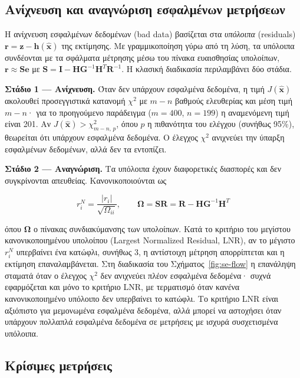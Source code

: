 \subsection{Ανίχνευση και αναγνώριση εσφαλμένων μετρήσεων}
\label{sec:baddata}

Η ανίχνευση εσφαλμένων δεδομένων (bad data) βασίζεται στα \emph{υπόλοιπα} (residuals)
$\mathbf{r} = \mathbf{z}-\mathbf{h}(\hat{\mathbf{x}})$ της εκτίμησης. Με γραμμικοποίηση γύρω από
τη λύση, τα υπόλοιπα συνδέονται με τα σφάλματα μέτρησης μέσω του πίνακα ευαισθησίας
υπολοίπων, $\mathbf{r} \approx \mathbf{S}\mathbf{e}$ με
$\mathbf{S} = \mathbf{I} - \mathbf{H}\mathbf{G}^{-1}\mathbf{H}^{T}\mathbf{R}^{-1}$. Η κλασική
διαδικασία περιλαμβάνει δύο στάδια.

\textbf{Στάδιο 1 --- Ανίχνευση.} Όταν δεν υπάρχουν εσφαλμένα δεδομένα, η τιμή
$J(\hat{\mathbf{x}})$ ακολουθεί προσεγγιστικά κατανομή $\chi^2$ με $m-n$ βαθμούς ελευθερίας
και μέση τιμή $m-n$· για το προηγούμενο παράδειγμα ($m = 400$, $n = 199$) η αναμενόμενη τιμή
είναι 201. Αν $J(\hat{\mathbf{x}}) > \chi^2_{m-n,\,p}$, όπου $p$ η πιθανότητα του ελέγχου
(συνήθως 95\%), θεωρείται ότι υπάρχουν εσφαλμένα δεδομένα. Ο έλεγχος $\chi^2$ ανιχνεύει την
ύπαρξη εσφαλμένων δεδομένων, αλλά δεν τα εντοπίζει.

\textbf{Στάδιο 2 --- Αναγνώριση.} Τα υπόλοιπα έχουν διαφορετικές διασπορές και δεν
συγκρίνονται απευθείας. Κανονικοποιούνται ως

\begin{equation}
r_i^{N} = \frac{|r_i|}{\sqrt{\Omega_{ii}}}, \qquad
\boldsymbol{\Omega} = \mathbf{S}\mathbf{R} = \mathbf{R} - \mathbf{H}\mathbf{G}^{-1}\mathbf{H}^{T}
\label{eq:normres}
\end{equation}

όπου $\boldsymbol{\Omega}$ ο πίνακας συνδιακύμανσης των υπολοίπων. Κατά το κριτήριο του
μεγίστου κανονικοποιημένου υπολοίπου (Largest Normalized Residual, LNR), αν το μέγιστο
$r_i^{N}$ υπερβαίνει ένα κατώφλι, συνήθως 3, η αντίστοιχη μέτρηση απορρίπτεται και η
εκτίμηση επαναλαμβάνεται. Στη διαδικασία του Σχήματος~\ref{fig:se-flow}
η επανάληψη σταματά όταν ο έλεγχος $\chi^2$ δεν ανιχνεύει πλέον εσφαλμένα δεδομένα· συχνά
εφαρμόζεται και μόνο το κριτήριο LNR, με τερματισμό όταν κανένα κανονικοποιημένο υπόλοιπο δεν
υπερβαίνει το κατώφλι. Το κριτήριο LNR είναι αξιόπιστο για μεμονωμένα
εσφαλμένα δεδομένα, αλλά μπορεί να αστοχήσει όταν υπάρχουν πολλαπλά εσφαλμένα δεδομένα σε
μετρήσεις με ισχυρά συσχετισμένα υπόλοιπα.

\subsection{Κρίσιμες μετρήσεις}
\label{sec:critical}

